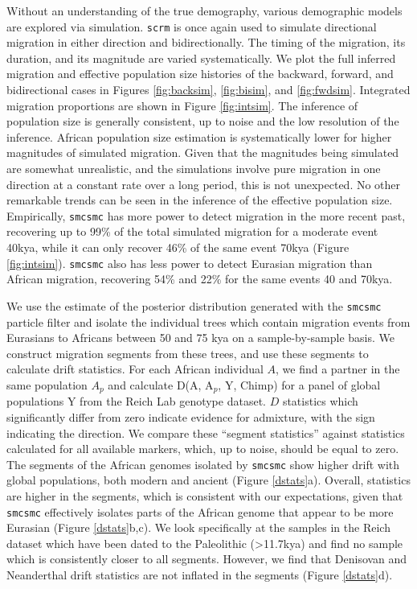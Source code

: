 \documentclass{article}
\begin{document}
Without an understanding of the true demography, various demographic models are explored via simulation. {\tt scrm} is once again used to simulate directional migration in either direction and bidirectionally. The timing of the migration, its duration, and its magnitude are varied systematically. We plot the full inferred migration and effective population size histories of the backward, forward, and bidirectional cases in Figures \ref{fig:backsim}, \ref{fig:bisim}, and \ref{fig:fwdsim}. Integrated migration proportions are shown in Figure \ref{fig:intsim}. The inference of population size is generally consistent, up to noise and the low resolution of the inference. African population size estimation is systematically lower for higher magnitudes of simulated migration. Given that the magnitudes being simulated are somewhat unrealistic, and the simulations involve pure migration in one direction at a constant rate over a long period, this is not unexpected. No other remarkable trends can be seen in the inference of the effective population size. Empirically, {\tt smcsmc} has more power to detect migration in the more recent past, recovering up to 99\% of the total simulated migration for a moderate event 40kya, while it can only recover 46\% of the same event 70kya (Figure \ref{fig:intsim}). {\tt smcsmc} also has less power to detect Eurasian migration than African migration, recovering 54\% and 22\% for the same events 40 and 70kya. 
 
We use the estimate of the posterior distribution generated with the {\tt smcsmc} particle filter and isolate the individual trees which contain migration events from Eurasians to Africans between 50 and 75 kya on a sample-by-sample basis. We construct migration segments from these trees, and use these segments to calculate drift statistics. For each African individual $A$, we find a partner in the same population $A_p$ and calculate D(A, A$_p$, Y, Chimp) for a panel of global populations Y from the Reich Lab genotype dataset. $D$ statistics which significantly differ from zero indicate evidence for admixture, with the sign indicating the direction. We compare these ``segment statistics'' against statistics calculated for all available markers, which, up to noise, should be equal to zero. The segments of the African genomes isolated by {\tt smcsmc} show higher drift with global populations, both modern and ancient (Figure \ref{dstats}a). Overall, statistics are higher in the segments, which is consistent with our expectations, given that {\tt smcsmc} effectively isolates parts of the African genome that appear to be more Eurasian (Figure \ref{dstats}b,c). We look specifically at the samples in the Reich dataset which have been dated to the Paleolithic (>11.7kya) and find no sample which is consistently closer to all segments. However, we find that Denisovan and Neanderthal drift statistics are not inflated in the segments (Figure \ref{dstats}d). 
\end{document}
